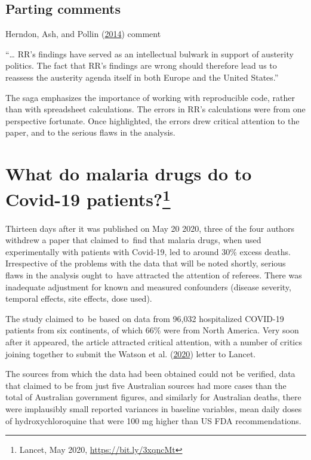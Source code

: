 \documentclass[
  10pt,
  b5paper]{book}
\begin{document}
\hypertarget{parting-comments}{%
\subsection*{Parting comments}\label{parting-comments}}

Herndon, Ash, and Pollin (\protect\hyperlink{ref-herndon2014does}{2014}) comment

``\ldots{} RR's findings have served as an intellectual bulwark in support of austerity politics. The fact that RR's findings are wrong should therefore lead us to reassess the austerity agenda itself in both Europe and the United States.''

The saga emphasizes the importance of working with reproducible code,
rather than with spreadsheet calculations.
The errors in RR's calculations were from one perspective fortunate.
Once highlighted, the errors drew critical attention to the paper,
and to the serious flaws in the analysis.

\hypertarget{sec:lancet}{%
\section[What do malaria drugs do to Covid-19 patients?]{\texorpdfstring{What do malaria drugs do to Covid-19 patients?\footnote{Lancet, May 2020, \url{https://bit.ly/3xqncMt}}}{What do malaria drugs do to Covid-19 patients?}}\label{sec:lancet}}

Thirteen days after it was published on May 20 2020, three of the
four authors withdrew a paper that claimed to~find that malaria drugs,
when used experimentally with patients with Covid-19, led to around
30\% excess deaths. Irrespective of the problems with the data that
will be noted shortly, serious flaws in the analysis ought to~have
attracted the attention of referees. There was inadequate
adjustment for known and measured confounders (disease severity,
temporal effects, site effects, dose used).

The study claimed to~be based on data from 96,032
hospitalized COVID-19 patients from six continents, of which 66\%
were from North America. Very soon after it appeared, the article
attracted critical attention, with a number of critics joining
together to submit the Watson et al. (\protect\hyperlink{ref-watson2020open}{2020}) letter to Lancet.

The sources from which the data had been obtained could not be verified,
data that claimed to be from just five Australian sources had more
cases than the total of Australian government figures, and similarly
for Australian deaths, there were implausibly small reported variances
in baseline variables, mean daily doses of hydroxychloroquine that were
100 mg higher than US FDA recommendations.
\end{document}
